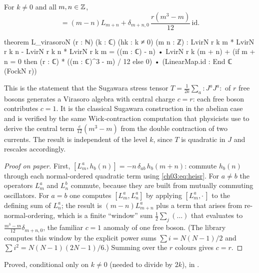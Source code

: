 \begin{theorem}[Virasoro relation, $c=r$]\label{ch03:thm:virasoroN}
For $k\ne0$ and all $m,n\in{\mathbb{Z}}$,
\begin{equation*}
[L_m,L_n]=(m-n)L_{m+n}+\delta_{m+n,0}\,\frac{r(m^3-m)}{12}\,\mathrm{id}.
\end{equation*}
\end{theorem}
\begin{leancode}
theorem L_virasoroN (r : ℕ) (k : ℂ) (hk : k ≠ 0) (m n : ℤ) :
    LvirN r k m * LvirN r k n - LvirN r k n * LvirN r k m
      = ((m : ℂ) - n) • LvirN r k (m + n)
        + (if m + n = 0 then (r : ℂ) * ((m : ℂ)^3 - m) / 12 else 0)
            • (LinearMap.id : End ℂ (FockN r))
\end{leancode}

\begin{physics}
This is the statement that the Sugawara stress tensor $T=\frac1{2k}\sum_a{:}J^aJ^a{:}$ of $r$ free bosons generates a Virasoro algebra with central charge $c=r$: each free boson contributes $c=1$. It is the classical Sugawara construction in the abelian case and is verified by the same Wick-contraction computation that physicists use to derive the central term $\frac{c}{12}(m^3-m)$ from the double contraction of two currents. The result is independent of the level $k$, since $T$ is quadratic in $J$ and rescales accordingly.
\end{physics}

\begin{proof}[Proof on paper]
First, $[L^a_m,h_b(n)]=-n\,\delta_{ab}\,h_b(m+n)$: commute $h_b(n)$ through each normal-ordered
quadratic term using \eqref{ch03:eq:heisr}. For $a\neq b$ the operators $L^a_m$ and $L^b_n$ commute,
because they are built from mutually commuting oscillators. For $a=b$ one computes
$[L^a_m,L^a_n]$ by applying $[L^a_m,\cdot\,]$ to the defining sum of $L^a_n$; the result is
$(m-n)L^a_{m+n}$ plus a term that arises from re-normal-ordering, which is a finite ``window'' sum
$\frac{1}{2}\sum_{j}(\ldots)$ that evaluates to $\frac{m^3-m}{12}\delta_{m+n,0}$, the familiar $c=1$
anomaly of one free boson. (The library computes this window by the explicit power sums
$\sum i=N(N-1)/2$ and $\sum i^2=N(N-1)(2N-1)/6$.) Summing over the $r$ colours gives $c=r$.
\end{proof}

\begin{status}
Proved, conditional only on $k\neq0$ (needed to divide by $2k$), in
.
\end{status}

